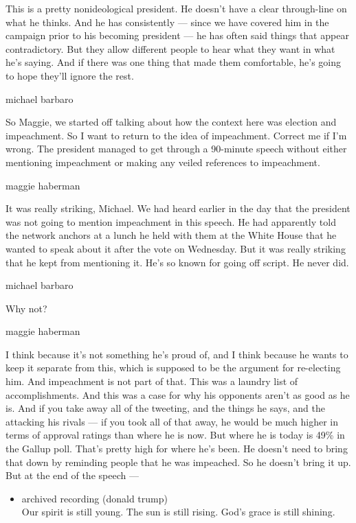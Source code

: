 This is a pretty nonideological president. He doesn't have a clear
through-line on what he thinks. And he has consistently --- since we
have covered him in the campaign prior to his becoming president --- he
has often said things that appear contradictory. But they allow
different people to hear what they want in what he's saying. And if
there was one thing that made them comfortable, he's going to hope
they'll ignore the rest.

michael barbaro

So Maggie, we started off talking about how the context here was
election and impeachment. So I want to return to the idea of
impeachment. Correct me if I'm wrong. The president managed to get
through a 90-minute speech without either mentioning impeachment or
making any veiled references to impeachment.

maggie haberman

It was really striking, Michael. We had heard earlier in the day that
the president was not going to mention impeachment in this speech. He
had apparently told the network anchors at a lunch he held with them at
the White House that he wanted to speak about it after the vote on
Wednesday. But it was really striking that he kept from mentioning it.
He's so known for going off script. He never did.

michael barbaro

Why not?

maggie haberman

I think because it's not something he's proud of, and I think because he
wants to keep it separate from this, which is supposed to be the
argument for re-electing him. And impeachment is not part of that. This
was a laundry list of accomplishments. And this was a case for why his
opponents aren't as good as he is. And if you take away all of the
tweeting, and the things he says, and the attacking his rivals --- if
you took all of that away, he would be much higher in terms of approval
ratings than where he is now. But where he is today is 49\% in the
Gallup poll. That's pretty high for where he's been. He doesn't need to
bring that down by reminding people that he was impeached. So he doesn't
bring it up. But at the end of the speech ---

\begin{itemize}
\tightlist
\item
  archived recording (donald trump)\\
  Our spirit is still young. The sun is still rising. God's grace is
  still shining.
\end{itemize}

